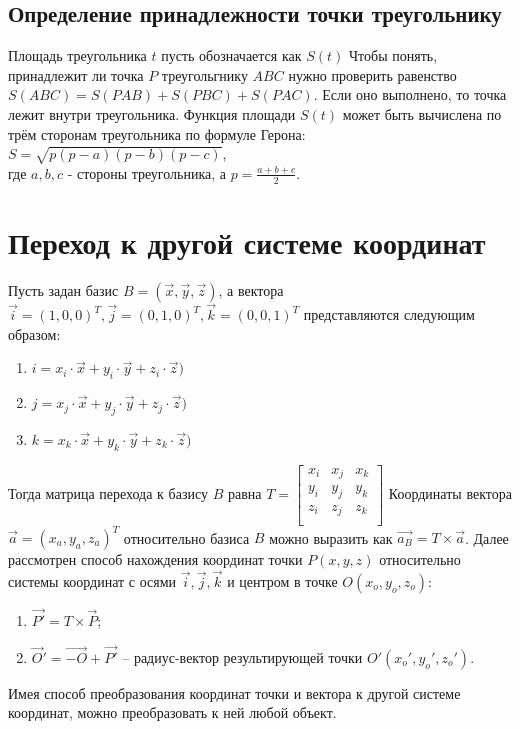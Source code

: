 {    \subsection{Определение принадлежности точки треугольнику} {
        \hspace{1.25cm} Площадь треугольника $t$ пусть обозначается как $S(t)$
        Чтобы понять, принадлежит ли точка $P$ треугольгнику $ABC$
        нужно проверить равенство $S(ABC) = S(PAB) + S(PBC) + S(PAC)$.
        Если оно выполнено, то точка лежит внутри треугольника.
        Функция площади $S(t)$ может быть вычислена по трём сторонам
        треугольника по формуле Герона:
        $S = \sqrt{p(p - a)(p - b)(p - c)}$, \\
        где $a, b, c$ - стороны треугольника, а $p = \frac{a + b + c}{2}.$
    }
}

\section{Переход к другой системе координат} {
    Пусть задан базис $B = (\vec{x}, \vec{y}, \vec{z})$,
    а вектора $\vec{i} = (1, 0, 0)^T, \vec{j} = (0, 1, 0)^T, \vec{k} = (0, 0, 1)^T$
    представляются следующим образом:
    \begin{enumerate}
        \item $i = x_i \cdot \vec{x} + y_i \cdot \vec{y} + z_i \cdot \vec{z})$
        \item $j = x_j \cdot \vec{x} + y_j \cdot \vec{y} + z_j \cdot \vec{z})$
        \item $k = x_k \cdot \vec{x} + y_k \cdot \vec{y} + z_k \cdot \vec{z})$
    \end{enumerate}
    Тогда матрица перехода к базису $B$ равна
    $T =
    \begin{bmatrix}
        x_i & x_j & x_k \\
        y_i & y_j & y_k \\
        z_i & z_j & z_k \\
    \end{bmatrix}
    $
    Координаты вектора $\vec{a} = (x_a, y_a, z_a)^T$ относительно базиса $B$ можно выразить как $\vec{a_B} = T \times \vec{a}$.
    Далее рассмотрен способ нахождения координат точки $P(x, y, z)$ относительно
    системы координат с осями $\vec{i}, \vec{j}, \vec{k}$ и центром в точке
    $O(x_o, y_o, z_o)$:
    \begin{enumerate}
        \item $\vec{P'} = T \times \vec{P}$;
        \item $\vec{O}' = \vec{-O} + \vec{P'}$ -- радиус-вектор результирующей
        точки $O'(x_o', y_o', z_o')$.
    \end{enumerate}
    Имея способ преобразования координат точки и вектора к другой системе координат,
    можно преобразовать к ней любой объект.
}
